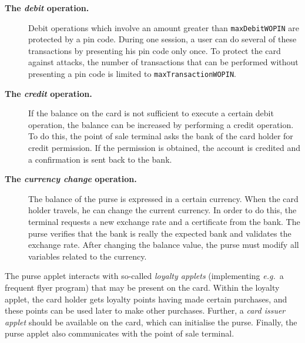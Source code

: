 \documentclass[a4paper]{llncs}
\begin{document}
\begin{description}
\item [\bf The \textit{debit} operation.]
Debit operations which involve an amount greater than
\texttt{maxDebitWOPIN} are protected by a pin code. During one session, 
a user can do several of these transactions by presenting his pin code
only once. To protect the card against attacks, the number of
transactions that can be performed without presenting a pin code is
limited to \texttt{maxTransactionWOPIN}.
\\


\item[\bf The \textit{credit} operation.]
If the balance on the card is not sufficient to execute a certain
debit operation, the balance can be increased by performing a credit
operation. To do this, the point of sale terminal asks the bank of the
card holder for credit permission. If the permission is obtained, the
account is credited and a confirmation is sent back to the bank.
\\
\item [\bf The \textit{currency change} operation.]
The balance
of the purse is expressed in a certain currency. When the card holder
travels, he can change the current currency. In order to do this, the
terminal requests a new exchange rate and a certificate from the
bank. The purse verifies that the bank is really the expected bank and
validates the exchange rate. After changing the balance value, the
purse must modify all variables related to the currency. 
\end{description}
The purse applet interacts with so-called \textit{loyalty applets}
(implementing \emph{e.g.}~a frequent flyer program) that may be
present on the card. Within the loyalty applet, the card holder gets
loyalty points having made certain purchases, and these points can be
used later to make other purchases. Further, a \textit{card issuer
applet} should be available on the card, which can initialise the
purse. Finally, the purse applet also communicates with the 
point of sale terminal. 
\end{document}
